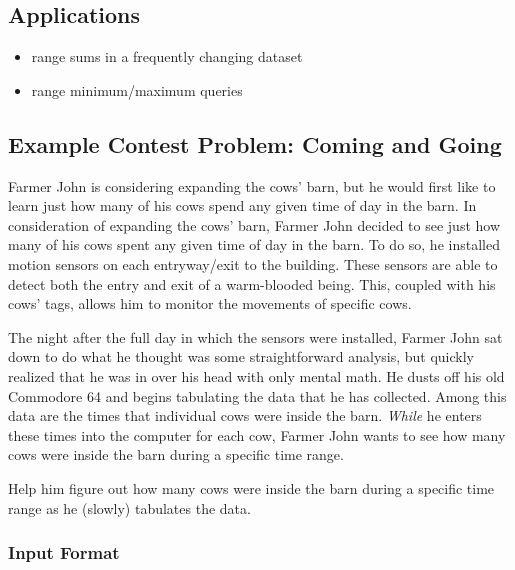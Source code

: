 \subsection{Applications}

\begin{itemize}
    \item range sums in a frequently changing dataset
    \item range minimum/maximum queries
\end{itemize}

\subsection{Example Contest Problem: Coming and Going}

Farmer John is considering expanding the cows' barn, but he would first like to learn just how many of his cows spend any given time of day in the barn.
In consideration of expanding the cows' barn, Farmer John decided to see just how many of his cows spent any given time of day in the barn.
To do so, he installed motion sensors on each entryway/exit to the building.
These sensors are able to detect both the entry and exit of a warm-blooded being.
This, coupled with his cows' tags, allows him to monitor the movements of specific cows.

The night after the full day in which the sensors were installed, Farmer John sat down to do what he thought was some straightforward analysis, but quickly realized that he was in over his head with only mental math.
He dusts off his old Commodore 64 and begins tabulating the data that he has collected.
Among this data are the times that individual cows were inside the barn.
\textit{While} he enters these times into the computer for each cow, Farmer John wants to see how many cows were inside the barn during a specific time range.

Help him figure out how many cows were inside the barn during a specific time range as he (slowly) tabulates the data.

\subsubsection{Input Format}

